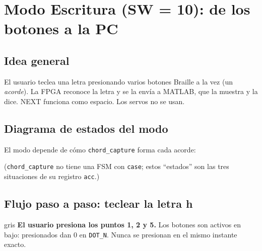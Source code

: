 \documentclass[11pt,a4paper]{article}
\newcommand{\cod}[1]{\texttt{#1}}
\begin{document}
\section{Modo Escritura (SW = 10): de los botones a la PC}

\subsection{Idea general}
El usuario teclea una letra presionando varios botones Braille a la vez (un
\emph{acorde}). La FPGA reconoce la letra y se la envía a MATLAB, que la muestra y la
dice. NEXT funciona como espacio. Los servos no se usan.

\subsection{Diagrama de estados del modo}
El modo depende de cómo \cod{chord\_capture} forma cada acorde:
\begin{center}
\end{center}
\begin{center}\small (\cod{chord\_capture} no tiene una FSM con \cod{case}; estos ``estados'' son las tres situaciones de su registro \cod{acc}.)\end{center}

\subsection{Flujo paso a paso: teclear la letra h}

\begin{paso}{gris}
\textbf{El usuario presiona los puntos 1, 2 y 5.} Los botones son
activos en bajo: presionados dan 0 en \cod{DOT\_N}. Nunca se presionan en el mismo
instante exacto.
\end{paso}
\end{document}
